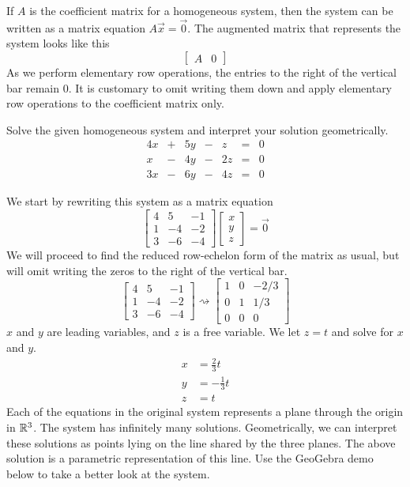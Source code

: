 \documentclass{ximera}
\begin{document}
If $A$ is the coefficient matrix for a homogeneous system, then the system can be written as a matrix equation $A\vec{x}=\vec{0}$. The augmented matrix that represents the system looks like this
$$\left[\begin{array}{c|c}  
 A&0
 \end{array}\right]$$
As we perform elementary row operations, the entries to the right of the vertical bar remain $0$.  It is customary to omit writing them down and apply elementary row operations to the coefficient matrix only.
\begin{example}
Solve the given homogeneous system and interpret your solution geometrically.
$$\begin{array}{ccccccc}
      4x &+ &5y&-&z&= &0 \\
	 x&- &4y&-&2z&= &0 \\
    3x &- &6y&-&4z&= &0
    \end{array}$$

\begin{explanation}\label{ex:homogeneouslinind} 
We start by rewriting this system as a matrix equation
$$\begin{bmatrix}4&5&-1\\1&-4&-2\\3&-6&-4\end{bmatrix}\begin{bmatrix}x\\y\\z\end{bmatrix}=\vec{0}$$
We will proceed to find the reduced row-echelon form of the matrix as usual, but will omit writing the zeros to the right of the vertical bar.
$$\begin{bmatrix}4&5&-1\\1&-4&-2\\3&-6&-4\end{bmatrix}\rightsquigarrow \begin{bmatrix}1&0&-2/3\\0&1&1/3\\0&0&0\end{bmatrix}$$
$x$ and $y$ are leading variables, and $z$ is a free variable.  We let $z=t$ and solve for $x$ and $y$.
\begin{align*}
x&=\frac{2}{3}t\\
y&=-\frac{1}{3}t\\
z&=t
\end{align*}
Each of the equations in the original system represents a plane through the origin in $\mathbb{R}^3$.  The system has infinitely many solutions.  Geometrically, we can interpret these solutions as points lying on the line shared by the three planes.  The above solution is a parametric representation of this line.  Use the GeoGebra demo below to take a better look at the system. 
\begin{center}
  \end{center}

\end{explanation}
\end{example}
\end{document}
